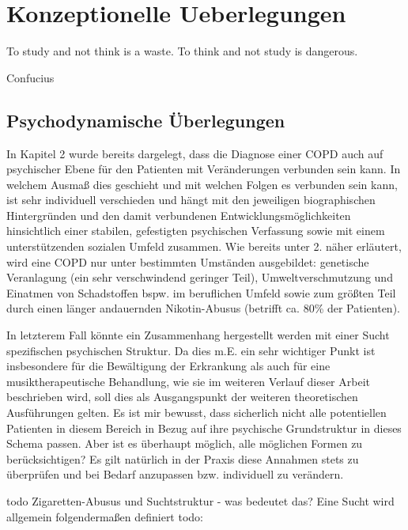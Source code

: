 
\chapter{Konzeptionelle Ueberlegungen}
\label{chapter:konzeptionelle_ueberlegungen}
\setlength{\epigraphwidth}{7.0cm}
\epigraph{To study and not think is a waste. To think and not study is dangerous.}{Confucius}

\section{Psychodynamische Überlegungen}
In Kapitel 2 wurde bereits dargelegt, dass die Diagnose einer COPD auch auf psychischer Ebene für den Patienten mit Veränderungen verbunden sein kann. In welchem Ausmaß dies geschieht und mit welchen Folgen es verbunden sein kann, ist sehr individuell verschieden und hängt mit den jeweiligen biographischen Hintergründen und den damit verbundenen Entwicklungsmöglichkeiten hinsichtlich einer stabilen, gefestigten psychischen Verfassung sowie mit einem unterstützenden sozialen Umfeld zusammen. 
Wie bereits unter 2. näher erläutert, wird eine COPD nur unter bestimmten Umständen ausgebildet: genetische Veranlagung (ein sehr verschwindend geringer Teil), Umweltverschmutzung und Einatmen von Schadstoffen bspw. im beruflichen Umfeld sowie zum größten Teil durch einen länger andauernden Nikotin-Abusus (betrifft ca. 80\% der Patienten). 

In letzterem Fall könnte ein Zusammenhang hergestellt werden mit einer Sucht spezifischen psychischen Struktur. Da dies m.E. ein sehr wichtiger Punkt ist insbesondere für die Bewältigung der Erkrankung als auch für eine musiktherapeutische Behandlung, wie sie im weiteren Verlauf dieser Arbeit beschrieben wird, soll dies als Ausgangspunkt der weiteren theoretischen Ausführungen gelten. Es ist mir bewusst, dass sicherlich nicht alle potentiellen Patienten in diesem Bereich in Bezug auf ihre psychische Grundstruktur in dieses Schema passen. Aber ist es überhaupt möglich, alle möglichen Formen zu berücksichtigen? Es gilt natürlich in der Praxis diese Annahmen stets zu überprüfen und bei Bedarf anzupassen bzw. individuell zu verändern. 

todo Zigaretten-Abusus und Suchtstruktur - was bedeutet das? Eine Sucht wird allgemein folgendermaßen definiert todo: 

